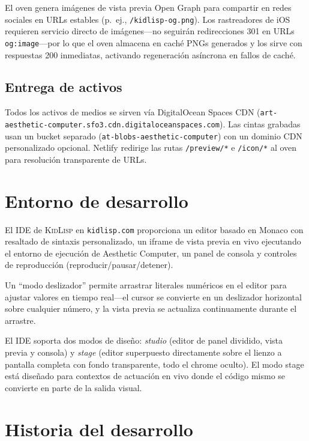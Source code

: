 \documentclass[10pt,letterpaper,twocolumn]{article}
\newcommand{\kidlisp}{\textsc{KidLisp}}
\begin{document}
El oven genera imágenes de vista previa Open Graph para compartir en redes sociales en URLs estables (p.~ej., \texttt{/kidlisp-og.png}). Los rastreadores de iOS requieren servicio directo de imágenes---no seguirán redirecciones 301 en URLs \texttt{og:image}---por lo que el oven almacena en caché PNGs generados y los sirve con respuestas 200 inmediatas, activando regeneración asíncrona en fallos de caché.

\subsection{Entrega de activos}

Todos los activos de medios se sirven vía DigitalOcean Spaces CDN (\texttt{art-aesthetic-computer.sfo3.cdn.\allowbreak digitaloceanspaces.com}). Las cintas grabadas usan un bucket separado (\texttt{at-blobs-aesthetic-computer}) con un dominio CDN personalizado opcional. Netlify redirige las rutas \texttt{/preview/*} e \texttt{/icon/*} al oven para resolución transparente de URLs.


\section{Entorno de desarrollo}

El IDE de \kidlisp{} en \texttt{kidlisp.com} proporciona un editor basado en Monaco con resaltado de sintaxis personalizado, un iframe de vista previa en vivo ejecutando el entorno de ejecución de Aesthetic Computer, un panel de consola y controles de reproducción (reproducir/pausar/detener).

Un ``modo deslizador'' permite arrastrar literales numéricos en el editor para ajustar valores en tiempo real---el cursor se convierte en un deslizador horizontal sobre cualquier número, y la vista previa se actualiza continuamente durante el arrastre.

El IDE soporta dos modos de diseño: \emph{studio} (editor de panel dividido, vista previa y consola) y \emph{stage} (editor superpuesto directamente sobre el lienzo a pantalla completa con fondo transparente, todo el chrome oculto). El modo stage está diseñado para contextos de actuación en vivo donde el código mismo se convierte en parte de la salida visual.


\section{Historia del desarrollo}
\label{sec:history}
\end{document}

